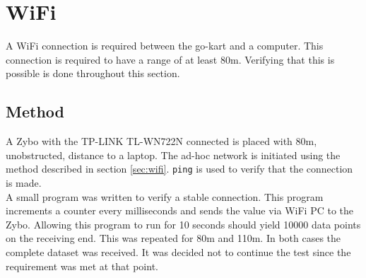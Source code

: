 \section{WiFi}
\label{sec:wifiverification}
A WiFi connection is required between the go-kart and a computer.
This connection is required to have a range of at least 80\si{\metre}.
Verifying that this is possible is done throughout this section.

\subsection{Method}
A Zybo with the TP-LINK TL-WN722N connected is placed with 80\si{\metre}, unobstructed, distance to a laptop.
The ad-hoc network is initiated using the method described in section \ref{sec:wifi}.
\texttt{ping} is used to verify that the connection is made.\\
A small program was written to verify a stable connection.
This program increments a counter every milliseconds and sends the value via WiFi PC to the Zybo.
Allowing this program to run for 10 seconds should yield 10000 data points on the receiving end.
This was repeated for 80\si{\metre} and 110\si{\metre}.
In both cases the complete dataset was received.
It was decided not to continue the test since the requirement was met at that point.

